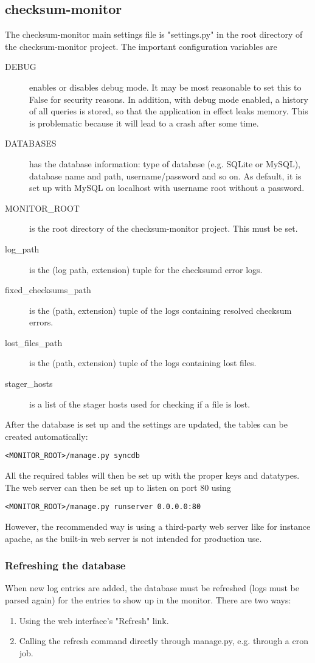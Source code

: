 \subsection{checksum-monitor}
The checksum-monitor main settings file is "settings.py" in the root directory of the checksum-monitor project. The important configuration variables are
\begin{description}
\item[DEBUG] enables or disables debug mode. It may be most reasonable to set this to False for security reasons. In addition, with debug mode enabled, a history of all queries is stored, so that the application in effect leaks memory. This is problematic because it will lead to a crash after some time.
\item[DATABASES] has the database information: type of database (e.g. SQLite or MySQL), database name and path, username/password and so on. As default, it is set up with MySQL on localhost with username root without a password.
\item[MONITOR\_ROOT] is the root directory of the checksum-monitor project. This must be set.
\item[log\_path] is the (log path, extension) tuple for the checksumd error logs.
\item[fixed\_checksums\_path] is the (path, extension) tuple of the logs containing resolved checksum errors.
\item[lost\_files\_path] is the (path, extension) tuple of the logs containing lost files.
\item[stager\_hosts] is a list of the stager hosts used for checking if a file is lost.
\end{description}

After the database is set up and the settings are updated, the tables can be created automatically:

{\tt <MONITOR\_ROOT>/manage.py syncdb} 

All the required tables will then be set up with the proper keys and datatypes. The web server can then be set up to listen on port 80 using

{\tt <MONITOR\_ROOT>/manage.py runserver 0.0.0.0:80} 

However, the recommended way is using a third-party web server like for instance apache, as the built-in web server is not intended for production use.

\subsubsection{Refreshing the database}
When new log entries are added, the database must be refreshed (logs must be parsed again) for the entries to show up in the monitor. There are two ways:
\begin{enumerate}
\item Using the web interface's "Refresh" link.
\item Calling the refresh command directly through manage.py, e.g. through a cron job.
\end{enumerate}

